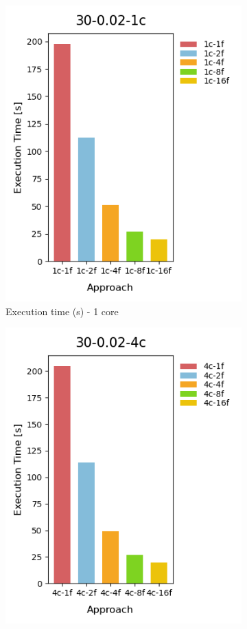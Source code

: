 \begin{figure}[H]
  \centering
  \begin{subfigure}[b]{0.45\textwidth}
    \centering
    \includegraphics[scale=0.6]{images/4-Experiments/E2/30-0.02-1c/execTime.png}
    \caption{Execution time (s) - 1 core}
  \end{subfigure}
  \hfill
  \begin{subfigure}[b]{0.45\textwidth}
    \centering
    \includegraphics[scale=0.6]{images/4-Experiments/E2/30-0.02-4c/execTime.png}

\end{subfigure}
\end{figure}
